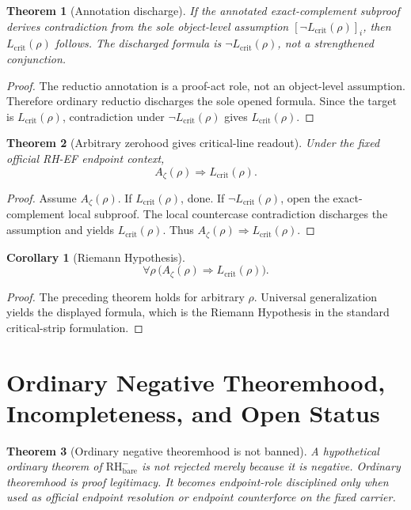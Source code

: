\documentclass[11pt]{article}
\newtheorem{theorem}{Theorem}[section]
\newtheorem{corollary}{Corollary}[section]
\newcommand{\Az}{A_{\zeta}}
\newcommand{\Lcrit}{L_{\mathrm{crit}}}
\newcommand{\RH}{\mathrm{RH}}
\begin{document}
\begin{theorem}[Annotation discharge]
If the annotated exact-complement subproof derives contradiction from the sole object-level assumption \([\neg\Lcrit(\rho)]_i\), then \(\Lcrit(\rho)\) follows.  The discharged formula is \(\neg\Lcrit(\rho)\), not a strengthened conjunction.
\end{theorem}

\begin{proof}
The reductio annotation is a proof-act role, not an object-level assumption.  Therefore ordinary reductio discharges the sole opened formula.  Since the target is \(\Lcrit(\rho)\), contradiction under \(\neg\Lcrit(\rho)\) gives \(\Lcrit(\rho)\).
\end{proof}

\begin{theorem}[Arbitrary zerohood gives critical-line readout]
Under the fixed official RH-EF endpoint context,
\[
\Az(\rho)\Rightarrow \Lcrit(\rho).
\]
\end{theorem}

\begin{proof}
Assume \(\Az(\rho)\).  If \(\Lcrit(\rho)\), done.  If \(\neg\Lcrit(\rho)\), open the exact-complement local subproof.  The local countercase contradiction discharges the assumption and yields \(\Lcrit(\rho)\).  Thus \(\Az(\rho)\Rightarrow\Lcrit(\rho)\).
\end{proof}

\begin{corollary}[Riemann Hypothesis]
\[
\forall \rho\,\bigl(\Az(\rho)\Rightarrow \Lcrit(\rho)\bigr).
\]
\end{corollary}

\begin{proof}
The preceding theorem holds for arbitrary \(\rho\).  Universal generalization yields the displayed formula, which is the Riemann Hypothesis in the standard critical-strip formulation.
\end{proof}

\section{Ordinary Negative Theoremhood, Incompleteness, and Open Status}

\begin{theorem}[Ordinary negative theoremhood is not banned]
A hypothetical ordinary theorem of \(\RH^-_{\mathrm{bare}}\) is not rejected merely because it is negative.  Ordinary theoremhood is proof legitimacy.  It becomes endpoint-role disciplined only when used as official endpoint resolution or endpoint counterforce on the fixed carrier.
\end{theorem}
\end{document}
